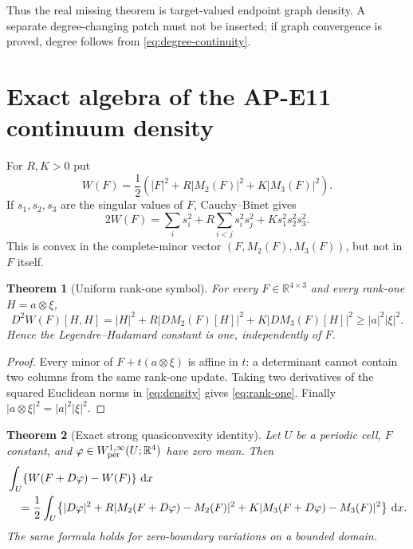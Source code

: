 \documentclass[11pt]{article}
\newtheorem{theorem}{Theorem}[section]
\newcommand{\dd}{\,\mathrm d}
\newcommand{\RR}{\mathbb R}
\begin{document}
Thus the real missing theorem is target-valued endpoint graph density.  A
separate degree-changing patch must not be inserted; if graph convergence is
proved, degree follows from \eqref{eq:degree-continuity}.

\section{Exact algebra of the AP-E11 continuum density}

For $R,K>0$ put
\begin{equation}
 W(F)=\frac12\left(|F|^2+R|M_2(F)|^2+K|M_3(F)|^2\right).
 \label{eq:density}
\end{equation}
If $s_1,s_2,s_3$ are the singular values of $F$, Cauchy--Binet gives
\begin{equation}
 2W(F)=\sum_i s_i^2+R\sum_{i<j}s_i^2s_j^2
       +K s_1^2s_2^2s_3^2.
 \label{eq:singular}
\end{equation}
This is convex in the complete-minor vector $(F,M_2(F),M_3(F))$, but not in
$F$ itself.

\begin{theorem}[Uniform rank-one symbol]
For every $F\in\RR^{4\times3}$ and every rank-one
$H=a\otimes\xi$,
\begin{equation}
 D^2W(F)[H,H]=|H|^2+R|DM_2(F)[H]|^2+K|DM_3(F)[H]|^2
 \geq |a|^2|\xi|^2.
 \label{eq:rank-one}
\end{equation}
Hence the Legendre--Hadamard constant is one, independently of $F$.
\end{theorem}

\begin{proof}
Every minor of $F+t(a\otimes\xi)$ is affine in $t$: a determinant cannot
contain two columns from the same rank-one update.  Taking two derivatives of
the squared Euclidean norms in \eqref{eq:density} gives
\eqref{eq:rank-one}.  Finally $|a\otimes\xi|^2=|a|^2|\xi|^2$.
\end{proof}

\begin{theorem}[Exact strong quasiconvexity identity]
Let $U$ be a periodic cell, $F$ constant, and
$\varphi\in W^{1,\infty}_{\rm per}(U;\RR^4)$ have zero mean.  Then
\begin{align}
 &\int_U\{W(F+D\varphi)-W(F)\}\,\dd x\notag\\
 &\quad=\frac12\int_U\bigl\{|D\varphi|^2
 +R|M_2(F+D\varphi)-M_2(F)|^2
 +K|M_3(F+D\varphi)-M_3(F)|^2\bigr\}\,\dd x.
 \label{eq:strong-qc}
\end{align}
The same formula holds for zero-boundary variations on a bounded domain.
\end{theorem}
\end{document}
